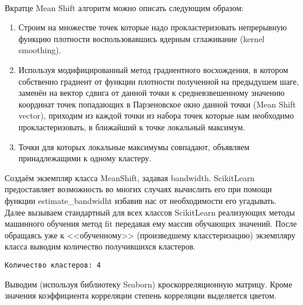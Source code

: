 \documentclass[11pt]{article}
\begin{document}
    \begin{center}
    \end{center}
    { \hspace*{\fill} \\}
    
    Вкратце Mean Shift алгоритм можно описать следующим
образом:

\begin{enumerate}
\item Строим на множестве точек которые надо прокластеризовать непрерывную функцию плотности воспользовавшись ядерным сглаживание (kernel smoothing).
\item Используя модифицированный метод градиентного восхождения, в котором собственно градиент от функции плотности полученной на предыдушем шаге, заменён на вектор сдвига от данной точки к средневзвешенному значению координат точек попадающих в Парзеновское окно данной точки (Mean Shift vector), приходим из каждой точки из набора точек которые нам необходимо прокластеризовать, в ближайший к точке локальный максимум.
\item Точки для которых локальные максимумы совпадают, объявляем принадлежащими к одному кластеру.
\end{enumerate}

    Создаём экземпляр класса MeanShift, задавая bandwidth. ScikitLearn
предоставляет возможность во многих случаях вычислить его при помощи
функции estimate\_bandwidht избавив нас от необходимости его угадывать.
Далее вызываем стандартный для всех классов ScikitLearn реализующих
методы машинного обучения метод fit передавая ему массив обучающих
значений. После обращаясь уже к <<обученному>> (произведшему
класстеризацию) экземпляру класса выводим количество получившихся
кластеров.

    \begin{Verbatim}[commandchars=\\\{\}]
Количество кластеров: 4

    \end{Verbatim}

    Выводим (используя библиотеку Seaborn) кроскорреляционную матрицу. Кроме
значения коэффициента корреляции степень корреляции выделяется цветом.

    \begin{center}
    \end{center}
    { \hspace*{\fill} \\}
    
\end{document}
